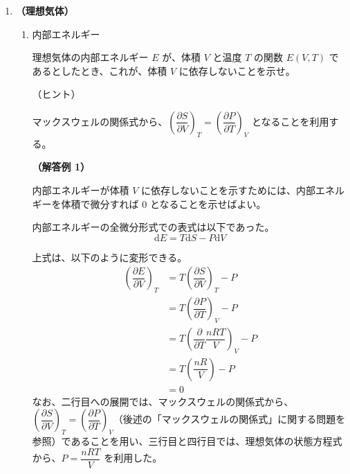 \documentclass[uplatex,dvipdfmx,a4paper,11pt]{jsarticle}
\newcommand{\diff}{\mathrm d}
\begin{document}
\begin{appendix}
\begin{enumerate}
{\bf （解答例）}

熱力学の第一法則より、
\begin{equation*}
\Delta E = \Delta Q - \Delta W  = \Delta Q - P\Delta V 
\end{equation*}
ここで、定積変化を考えるのであるから、$\Delta V = 0$、したがって、
\begin{equation*}
\Delta E = \Delta Q
\end{equation*}

一方、定積モル比熱の定義は、「体積を一定に保つ場合のモル比熱であり、定積条件下で物質 1 モルの温度を １ Ｋ 増加させるために必要な熱量」であり、
\begin{equation*}
\Delta Q = n \times C_V \times \Delta T 
\end{equation*}

上に示した二つの式から、
\begin{align*}
n \times C_V \times \Delta T &=\Delta E \\
\therefore C_V &= \dfrac{1}{n} \left( \dfrac{\partial E}{\partial T} \right)_V
\end{align*}




\item
{\bf （理想気体）}

\begin{enumerate}
\item
内部エネルギー

理想気体の内部エネルギー $E$ が、体積 $V$ と温度 $T$ の関数 $E(V,T)$ であるとしたとき、これが、体積 $V$ に依存しないことを示せ。

（ヒント）

マックスウェルの関係式から、$\left(\dfrac{\partial S}{\partial V} \right)_T = \left(\dfrac{\partial P}{\partial T} \right)_V$ となることを利用する。

{\bf （解答例 1）}

内部エネルギーが体積 $V$ に依存しないことを示すためには、内部エネルギーを体積で微分すれば 0 となることを示せばよい。

内部エネルギーの全微分形式での表式は以下であった。
\begin{equation*}
\diff E = T \diff S -P \diff V
\end{equation*}

上式は、以下のように変形できる。
\begin{align*}
\left(\dfrac{\partial E}{\partial V} \right)_T 
	&= T \left(\dfrac{\partial S}{\partial V} \right)_T -P \\
	&= T \left(\dfrac{\partial P}{\partial T} \right)_V -P \\
	&= T \left(\dfrac{\partial}{\partial T} \dfrac {nRT}{V} \right)_V -P \\
	&= T \left(\dfrac {nR}{V}\right) -P \\
	&= 0
\end{align*}
なお、二行目への展開では、マックスウェルの関係式から、$\left(\dfrac{\partial S}{\partial V} \right)_T = \left(\dfrac{\partial P}{\partial T} \right)_V$（後述の「マックスウェルの関係式」に関する問題を参照）であることを用い、三行目と四行目では、理想気体の状態方程式から、$P = \dfrac {nRT}{V}$ を利用した。


\end{enumerate}
\end{enumerate}
\end{appendix}
\end{document}

